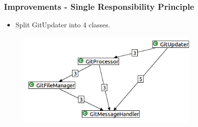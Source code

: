 \documentclass{beamer}
\begin{document}
\begin{frame}
    \frametitle{Improvements - Single Responsibility Principle}
    \begin{itemize}
        \item Split GitUpdater into 4 classes.
    \end{itemize}
    
    \begin{figure}
    	\centering
    	\includegraphics[width=0.8\textwidth]{../img/gitUpdaterDependencies.png}
    \end{figure}
\end{frame}
\end{document}
